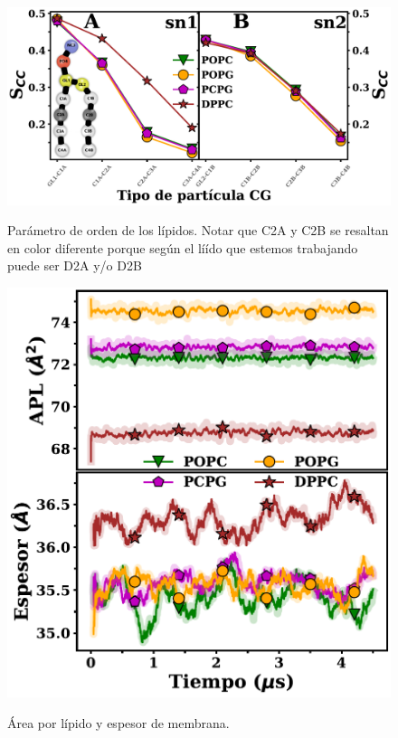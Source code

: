 \begin{figure}[H]
    \centering
	\includegraphics[width=1\linewidth, height=0.99\textheight, keepaspectratio]{fig/02_dm/scc_all.pdf} 
\caption[Parámetro de orden de los lípidos]{Parámetro de orden de los lípidos. Notar que C2A y C2B se resaltan en color diferente porque según el líído que estemos trabajando puede ser D2A y/o D2B}
    \label{fig:scc}
\end{figure}


\begin{figure}[]
    \centering
	\includegraphics[width=1\linewidth, height=0.99\textheight, keepaspectratio]{fig/02_dm/ApL_zthickness_all.pdf} 
\caption[Área por lípido y espesor de membrana.]{Área por lípido y espesor de membrana.}
    \label{fig:apl_zThick}
\end{figure}



